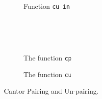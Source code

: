 \documentclass[preprint]{elsarticle}
\theoremstyle{remark}
\begin{document}
\begin{figure}
\begin{subfigure}{.975\textwidth}
\label{sfig:cu step y = 0}
\end{subfigure}
\\ \\ \\
\begin{subfigure}{.975\textwidth}
\centering
{}
\caption{Function \lstinline|cu_in|}
\label{sfig:cu input}
\end{subfigure}
\\ \\ \\
\begin{subfigure}{.665\textwidth}
    \centering
{}
\caption{The function \lstinline|cp|}
\label{sfig:cp}
\end{subfigure}
\hfill
\begin{subfigure}{.325\textwidth}
\centering
{}
\caption{The function \lstinline|cu|}
\label{sfig:cu}
\end{subfigure}
\caption{Cantor Pairing and Un-pairing.}
\label{fig:Cantor}
\end{figure}
\end{document}
